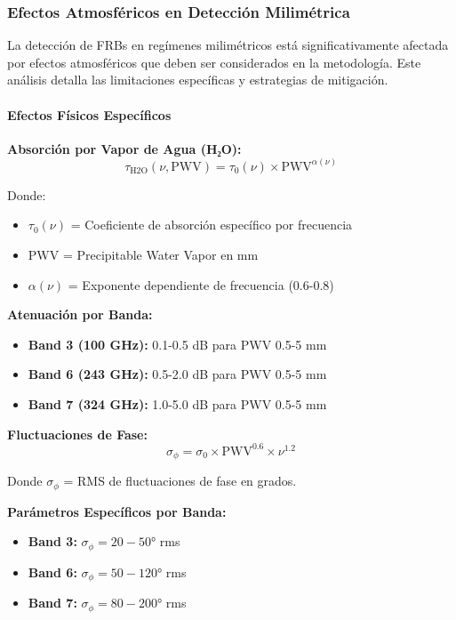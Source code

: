 \subsubsection{Efectos Atmosféricos en Detección Milimétrica}

La detección de FRBs en regímenes milimétricos está significativamente afectada por efectos atmosféricos que deben ser considerados en la metodología. Este análisis detalla las limitaciones específicas y estrategias de mitigación.

\paragraph{Efectos Físicos Específicos}

\textbf{Absorción por Vapor de Agua (H₂O):}
\[
\tau_{\text{H2O}}(\nu, \text{PWV}) = \tau_0(\nu) \times \text{PWV}^{\alpha(\nu)}
\]

Donde:
\begin{itemize}
\item $\tau_0(\nu)$ = Coeficiente de absorción específico por frecuencia
\item $\text{PWV}$ = Precipitable Water Vapor en mm
\item $\alpha(\nu)$ = Exponente dependiente de frecuencia (0.6-0.8)
\end{itemize}

\textbf{Atenuación por Banda:}
\begin{itemize}
\item \textbf{Band 3 (100 GHz):} 0.1-0.5 dB para PWV 0.5-5 mm
\item \textbf{Band 6 (243 GHz):} 0.5-2.0 dB para PWV 0.5-5 mm
\item \textbf{Band 7 (324 GHz):} 1.0-5.0 dB para PWV 0.5-5 mm
\end{itemize}

\textbf{Fluctuaciones de Fase:}
\[
\sigma_{\phi} = \sigma_0 \times \text{PWV}^{0.6} \times \nu^{1.2}
\]

Donde $\sigma_{\phi}$ = RMS de fluctuaciones de fase en grados.

\textbf{Parámetros Específicos por Banda:}
\begin{itemize}
\item \textbf{Band 3:} $\sigma_{\phi} = 20-50°$ rms
\item \textbf{Band 6:} $\sigma_{\phi} = 50-120°$ rms  
\item \textbf{Band 7:} $\sigma_{\phi} = 80-200°$ rms
\end{itemize}

